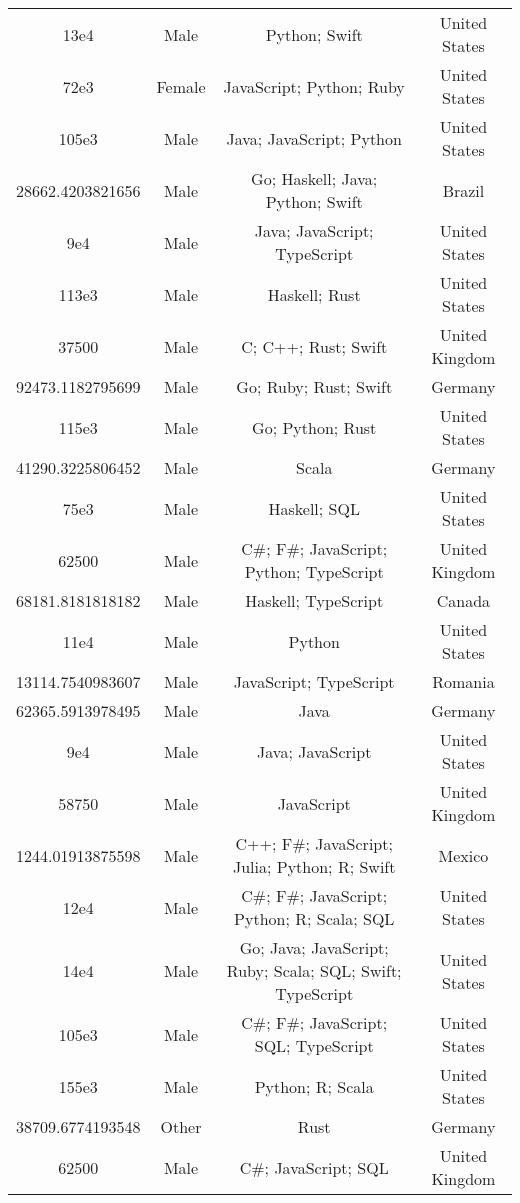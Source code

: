 \begin{center}
\begin{tabular}{ |c|c|c|c| }
13e4  &  Male  &  Python; Swift  &  United States  \\ 
72e3  &  Female  &  JavaScript; Python; Ruby  &  United States  \\ 
105e3  &  Male  &  Java; JavaScript; Python  &  United States  \\ 
28662.4203821656  &  Male  &  Go; Haskell; Java; Python; Swift  &  Brazil  \\ 
9e4  &  Male  &  Java; JavaScript; TypeScript  &  United States  \\ 
113e3  &  Male  &  Haskell; Rust  &  United States  \\ 
37500  &  Male  &  C; C++; Rust; Swift  &  United Kingdom  \\ 
92473.1182795699  &  Male  &  Go; Ruby; Rust; Swift  &  Germany  \\ 
115e3  &  Male  &  Go; Python; Rust  &  United States  \\ 
41290.3225806452  &  Male  &  Scala  &  Germany  \\ 
75e3  &  Male  &  Haskell; SQL  &  United States  \\ 
62500  &  Male  &  C\#; F\#; JavaScript; Python; TypeScript  &  United Kingdom  \\ 
68181.8181818182  &  Male  &  Haskell; TypeScript  &  Canada  \\ 
11e4  &  Male  &  Python  &  United States  \\ 
13114.7540983607  &  Male  &  JavaScript; TypeScript  &  Romania  \\ 
62365.5913978495  &  Male  &  Java  &  Germany  \\ 
9e4  &  Male  &  Java; JavaScript  &  United States  \\ 
58750  &  Male  &  JavaScript  &  United Kingdom  \\ 
1244.01913875598  &  Male  &  C++; F\#; JavaScript; Julia; Python; R; Swift  &  Mexico  \\ 
12e4  &  Male  &  C\#; F\#; JavaScript; Python; R; Scala; SQL  &  United States  \\ 
14e4  &  Male  &  Go; Java; JavaScript; Ruby; Scala; SQL; Swift; TypeScript  &  United States  \\ 
105e3  &  Male  &  C\#; F\#; JavaScript; SQL; TypeScript  &  United States  \\ 
155e3  &  Male  &  Python; R; Scala  &  United States  \\ 
38709.6774193548  &  Other  &  Rust  &  Germany  \\ 
62500  &  Male  &  C\#; JavaScript; SQL  &  United Kingdom  \\ 

\end{tabular}
\end{center}
